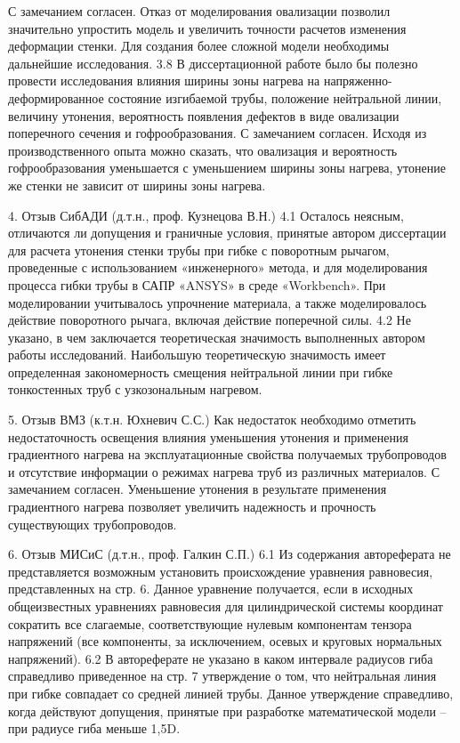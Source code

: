 С замечанием согласен. Отказ от моделирования овализации позволил значительно упростить модель и увеличить точности расчетов изменения деформации стенки. Для создания более сложной модели необходимы дальнейшие исследования.
3.8 В диссертационной работе было бы полезно провести исследования влияния ширины зоны нагрева на напряженно-деформированное состояние изгибаемой трубы, положение нейтральной линии, величину утонения, вероятность появления дефектов в виде овализации поперечного сечения и гофрообразования.
С замечанием согласен. Исходя из производственного опыта можно сказать, что овализация и вероятность гофрообразования уменьшается с уменьшением ширины зоны нагрева, утонение же стенки не зависит от ширины зоны нагрева.


4. Отзыв СибАДИ (д.т.н., проф. Кузнецова В.Н.)
4.1 Осталось неясным, отличаются ли допущения и граничные условия, принятые автором диссертации для расчета утонения стенки трубы при гибке с поворотным рычагом, проведенные с использованием «инженерного» метода, и для моделирования процесса гибки трубы в САПР «ANSYS» в среде «Workbench».
При моделировании учитывалось упрочнение материала, а также моделировалось действие поворотного рычага, включая действие поперечной силы.
4.2 Не указано, в чем заключается теоретическая значимость выполненных автором работы исследований.
Наибольшую теоретическую значимость имеет определенная закономерность смещения нейтральной линии при гибке тонкостенных труб с узкозональным нагревом.

5. Отзыв ВМЗ (к.т.н. Юхневич С.С.)
Как недостаток необходимо отметить недостаточность освещения влияния уменьшения утонения и применения градиентного нагрева на эксплуатационные свойства получаемых трубопроводов и отсутствие информации о режимах нагрева труб из различных материалов.
С замечанием согласен. Уменьшение утонения в результате применения градиентного нагрева позволяет увеличить надежность и прочность существующих трубопроводов.

6. Отзыв МИСиС (д.т.н., проф. Галкин С.П.)
6.1 Из содержания автореферата не представляется возможным установить происхождение уравнения равновесия, представленных на стр. 6.
Данное уравнение получается, если в исходных общеизвестных уравнениях равновесия для цилиндрической системы координат сократить все слагаемые, соответствующие нулевым компонентам тензора напряжений (все компоненты, за исключением, осевых и круговых нормальных напряжений).
6.2 В автореферате не указано в каком интервале радиусов гиба справедливо приведенное на стр. 7 утверждение о том, что нейтральная линия при гибке совпадает со средней линией трубы.
Данное утверждение справедливо, когда действуют допущения, принятые при разработке математической модели – при радиусе гиба меньше 1,5D.





